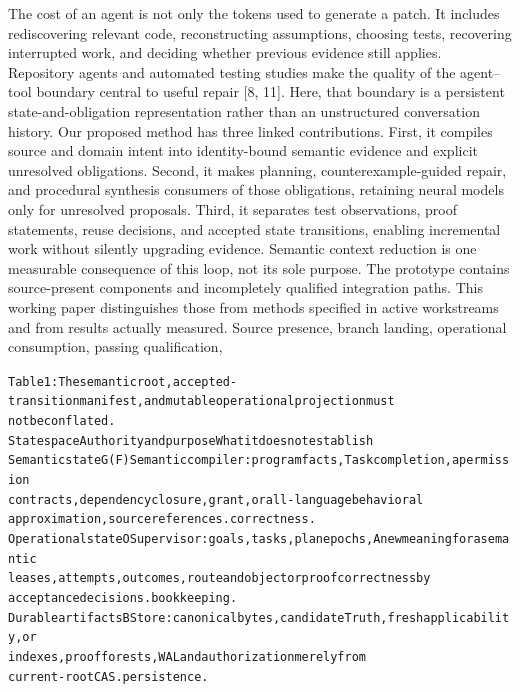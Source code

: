 \documentclass{article}
\begin{document}
The cost of an agent is not only the tokens used to generate a patch. It includes rediscovering
relevant code, reconstructing assumptions, choosing tests, recovering interrupted work, and deciding
whether previous evidence still applies. Repository agents and automated testing studies make the
quality of the agent–tool boundary central to useful repair [8, 11]. Here, that boundary is a persistent
state-and-obligation representation rather than an unstructured conversation history.
Our proposed method has three linked contributions. First, it compiles source and domain intent into
identity-bound semantic evidence and explicit unresolved obligations. Second, it makes planning,
counterexample-guided repair, and procedural synthesis consumers of those obligations, retaining
neural models only for unresolved proposals. Third, it separates test observations, proof statements,
reuse decisions, and accepted state transitions, enabling incremental work without silently upgrading
evidence. Semantic context reduction is one measurable consequence of this loop, not its sole
purpose.
The prototype contains source-present components and incompletely qualified integration paths. This
working paper distinguishes those from methods specified in active workstreams and from results
actually measured. Source presence, branch landing, operational consumption, passing qualification,

\begingroup\fontsize{7}{8.4}\selectfont
\begin{alltt}
Table 1: The semantic root, accepted-transition manifest, and mutable operational projection must
not be conflated.
State space               Authority and purpose                    What it does not establish
Semantic state G(F)       Semantic compiler: program facts,        Task completion, a permission
                          contracts, dependency closure,           grant, or all-language behavioral
                          approximation, source references.        correctness.
Operational state O       Supervisor: goals, tasks, plan epochs,   A new meaning for a semantic
                          leases, attempts, outcomes, route and    object or proof correctness by
                          acceptance decisions.                    bookkeeping.
Durable artifacts B       Store: canonical bytes, candidate        Truth, fresh applicability, or
                          indexes, proof forests, WAL and          authorization merely from
                          current-root CAS.                        persistence.
\end{alltt}\endgroup
\end{document}
